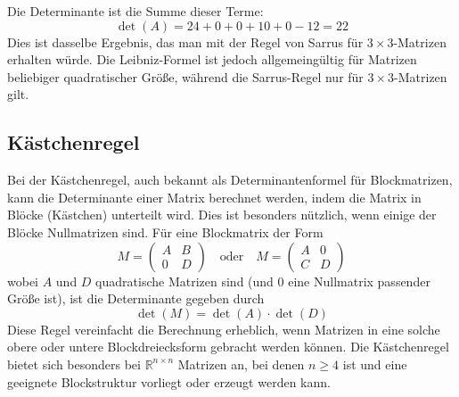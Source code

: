 Die Determinante ist die Summe dieser Terme:
\[ \det(A) = 24 + 0 + 0 + 10 + 0 - 12 = 22 \]
Dies ist dasselbe Ergebnis, das man mit der Regel von Sarrus für $3 \times 3$-Matrizen erhalten würde. Die Leibniz-Formel ist jedoch allgemeingültig für Matrizen beliebiger quadratischer Größe, während die Sarrus-Regel nur für $3 \times 3$-Matrizen gilt.

\subsection{Kästchenregel}

Bei der Kästchenregel, auch bekannt als Determinantenformel für Blockmatrizen, kann die Determinante einer Matrix berechnet werden, indem die Matrix in Blöcke (Kästchen) unterteilt wird. Dies ist besonders nützlich, wenn einige der Blöcke Nullmatrizen sind.
Für eine Blockmatrix der Form
\[ M = \begin{pmatrix} A & B \\ 0 & D \end{pmatrix} \quad \text{oder} \quad M = \begin{pmatrix} A & 0 \\ C & D \end{pmatrix} \]
wobei $A$ und $D$ quadratische Matrizen sind (und $0$ eine Nullmatrix passender Größe ist), ist die Determinante gegeben durch
\[ \det(M) = \det(A) \cdot \det(D) \]
Diese Regel vereinfacht die Berechnung erheblich, wenn Matrizen in eine solche obere oder untere Blockdreiecksform gebracht werden können. Die Kästchenregel bietet sich besonders bei $\mathbb{R}^{n \times n}$ Matrizen an, bei denen $n \geq 4$ ist und eine geeignete Blockstruktur vorliegt oder erzeugt werden kann.

